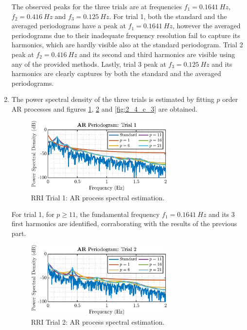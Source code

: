 \begin{enumerate}[label=\alph*), leftmargin=*]
The observed peaks for the three trials are at frequencies $f_{1} = 0.1641\ Hz$, $f_{2} = 0.416\ Hz$ and $f_{3} = 0.125\ Hz$.
For trial 1, both the standard and the averaged periodograms have a peak at $f_{1} = 0.1641\ Hz$, however the averaged periodograms due to their inadequate frequency resolution
fail to capture its harmonics, which are hardly visible also at the standard periodogram. Trial 2 peak at $f_{2} = 0.416\ Hz$ and its second and third harmonics are visible
using any of the provided methods. Lastly, trial 3 peak at $f_{3} = 0.125\ Hz$ and its harmonics are clearly captures by both the standard and the averaged periodograms.

\pagebreak

\item
%

The power spectral density of the three trials is estimated by fitting $p$ order AR processes and figures \ref{fig:2_4_c_1}, \ref{fig:2_4_c_2} and \ref{fig:2_4_c_3} are obtained.

\begin{figure}[h]
    \centering
    \includegraphics[height=1.5in]{report/parametric-and-line-spectra/real-world-signals_respiratory-sinus-arrhythmia-from-RR-Intervals/assets/c/standard_ar-trial1}
    \caption{RRI Trial 1: AR process spectral estimation.}
    \label{fig:2_4_c_1}
\end{figure}

For trial 1, for $p \geq 11$, the fundamental frequency $f_{1} = 0.1641\ Hz$ and its 3 first harmonics are identified, corraborating with the results of the previous part.

\begin{figure}[h]
    \centering
    \includegraphics[height=1.5in]{report/parametric-and-line-spectra/real-world-signals_respiratory-sinus-arrhythmia-from-RR-Intervals/assets/c/standard_ar-trial2}
    \caption{RRI Trial 2: AR process spectral estimation.}
    \label{fig:2_4_c_2}
\end{figure}


\end{enumerate}
